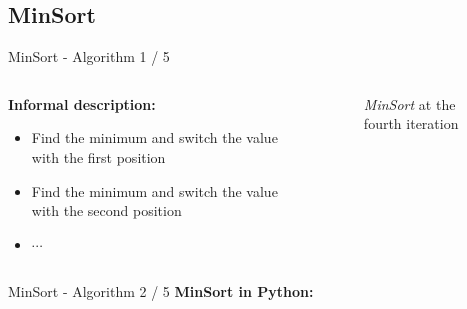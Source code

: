 \subsection{MinSort}

\begin{frame}{MinSort - Algorithm 1 / 5}
  \begin{columns}
    \begin{column}{0.5\textwidth}
      \textbf{Informal description:}
      \begin{itemize}
        \item
          Find the minimum and switch the value with the
          {\color{Mittel-Blau}first} position
        \item
          Find the minimum and switch the value with the
          {\color{Mittel-Blau}second} position
        \item
          $\cdots$
      \end{itemize}
    \end{column}
    \begin{column}{0.5\textwidth}
      \begin{figure}[!h]%
        \caption{\textit{MinSort} at the fourth iteration}%
        \label{fig:minsort_fourth_iteration}%
      \end{figure}%
    \end{column}
  \end{columns}
\end{frame}


\begin{frame}{MinSort - Algorithm 2 / 5}
  \textbf{MinSort in Python:}
  
\end{frame}


